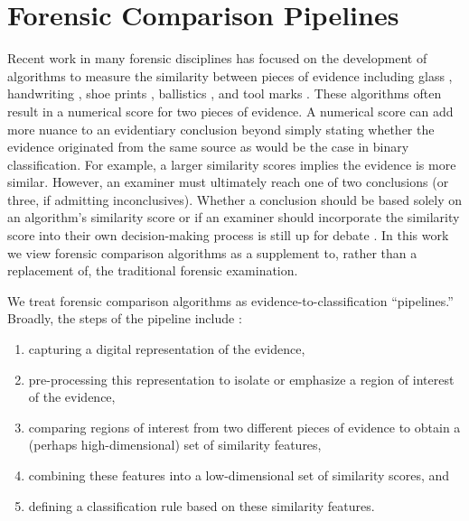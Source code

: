 \documentclass[11pt,]{isuthesis}
\begin{document}
\hypertarget{forensic-comparison-pipelines}{%
\section{Forensic Comparison Pipelines}\label{forensic-comparison-pipelines}}

Recent work in many forensic disciplines has focused on the development of algorithms to measure the similarity between pieces of evidence including glass \citep{Curran2000-hp, Park2019, openForSciR}, handwriting \citep{crawford_handwriting_2020}, shoe prints \citep{park_algorithm_2020}, ballistics \citep{hare_automatic_2016, tai_fully_2018}, and tool marks \citep{Hadler2017, Krishnan2018}.
These algorithms often result in a numerical score for two pieces of evidence.
A numerical score can add more nuance to an evidentiary conclusion beyond simply stating whether the evidence originated from the same source as would be the case in binary classification.
For example, a larger similarity scores implies the evidence is more similar.
However, an examiner must ultimately reach one of two conclusions (or three, if admitting inconclusives).
Whether a conclusion should be based solely on an algorithm's similarity score or if an examiner should incorporate the similarity score into their own decision-making process is still up for debate \citep{Swofford2021}.
In this work we view forensic comparison algorithms as a supplement to, rather than a replacement of, the traditional forensic examination.

We treat forensic comparison algorithms as evidence-to-classification ``pipelines.''
Broadly, the steps of the pipeline include \citet{Rice2020}:

\begin{enumerate}
\def\labelenumi{\arabic{enumi}.}
\item
  capturing a digital representation of the evidence,
\item
  pre-processing this representation to isolate or emphasize a region of interest of the evidence,
\item
  comparing regions of interest from two different pieces of evidence to obtain a (perhaps high-dimensional) set of similarity features,
\item
  combining these features into a low-dimensional set of similarity scores, and
\item
  defining a classification rule based on these similarity features.
\end{enumerate}
\end{document}
